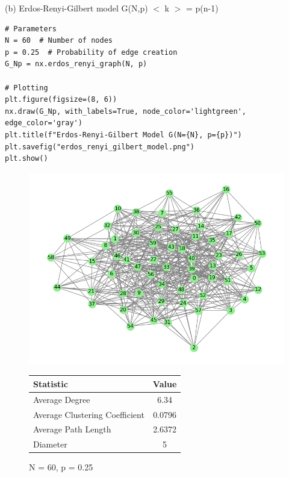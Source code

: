 \documentclass[10pt,letterpaper, onecolumn]{report}
\begin{document}
\begin{flushleft}
    \clearpage

    (b) Erdos-Renyi-Gilbert model G(N,p) $<$ k $>$ = p(n-1)

    \begin{lstlisting}[style=myPythonStyle, caption={Erdos-Renyi model}]
# Parameters
N = 60  # Number of nodes
p = 0.25  # Probability of edge creation
G_Np = nx.erdos_renyi_graph(N, p)

# Plotting
plt.figure(figsize=(8, 6))
nx.draw(G_Np, with_labels=True, node_color='lightgreen', edge_color='gray')
plt.title(f"Erdos-Renyi-Gilbert Model G(N={N}, p={p})")
plt.savefig("erdos_renyi_gilbert_model.png")
plt.show()
     \end{lstlisting}


    \begin{figure}[htbp!]
        \centering
        \begin{minipage}{0.5\textwidth} %
            \centering
            \includegraphics[width=\textwidth]{../erdos_renyi_gilbert_model.png} %
            \caption{N = 60, p = 0.25}
            \label{fig:erdos_renyi}
        \end{minipage}%
        \begin{minipage}{0.5\textwidth} %
            \centering
            \begin{tabular}{|l|c|}
                \hline
                \textbf{Statistic} & \textbf{Value} \\
                \hline
                Average Degree & 6.34 \\
                Average Clustering Coefficient & 0.0796 \\
                Average Path Length & 2.6372 \\
                Diameter & 5 \\
                \hline
            \end{tabular}
            \label{tab:erdos_renyi_stats}
        \end{minipage}
    \end{figure}


\end{flushleft}
\end{document}
